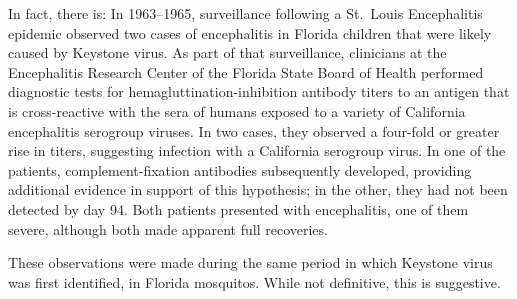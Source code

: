 \documentclass[12pt]{article}
\newcommand{\cjh}{\textcolor{blue}{cjh}}
\newcommand{\tjh}{\textcolor{red}{tjh}}
\newcommand{\msg}[3]{(#1 $\rightarrow$ #2: #3)}
\newcommand{\mcc}[1]{\msg\cjh\cjh{#1}}
\newcommand{\mct}[1]{\msg\cjh\tjh{#1}}
\begin{document}
        In fact, there is: In 1963--1965, surveillance following a St.\ Louis Encephalitis epidemic observed two cases of encephalitis in Florida children that were likely caused by Keystone virus. As part of that surveillance, clinicians at the Encephalitis Research Center of the Florida State Board of Health performed diagnostic tests for hemagluttination-inhibition antibody titers to an antigen that is cross-reactive with the sera of humans exposed to a variety of California encephalitis serogroup viruses. In two cases, they observed a four-fold or greater rise in titers, suggesting infection with a California serogroup virus. In one of the patients, complement-fixation antibodies subsequently developed, providing additional evidence in support of this hypothesis; in the other, they had not been detected by day 94. Both patients presented with encephalitis, one of them severe, although both made apparent full recoveries.\cite{bond1966california}

    These observations were made during the same period in which Keystone virus was first identified, in Florida mosquitos.\cite{bond1966california} While not definitive, this is suggestive. %
    
\end{document}
